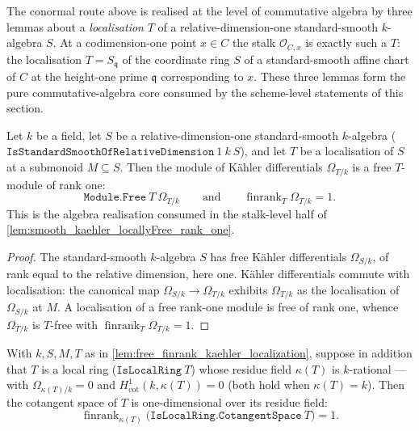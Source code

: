 The conormal route above is realised at the level of commutative algebra by
three lemmas about a \emph{localisation} \(T\) of a relative-dimension-one
standard-smooth \(k\)-algebra \(S\). At a codimension-one point \(x \in C\) the
stalk \(\mathcal O_{C, x}\) is exactly such a \(T\): the localisation
\(T = S_{\mathfrak q}\) of the coordinate ring \(S\) of a standard-smooth affine
chart of \(C\) at the height-one prime \(\mathfrak q\) corresponding to \(x\).
These three lemmas form the pure commutative-algebra core consumed by the
scheme-level statements of this section.

\begin{lemma}
  \label{lem:free_finrank_kaehler_localization}
  Let \(k\) be a field, let \(S\) be a relative-dimension-one standard-smooth
  \(k\)-algebra (\(\texttt{IsStandardSmoothOfRelativeDimension}\ 1\ k\ S\)), and
  let \(T\) be a localisation of \(S\) at a submonoid \(M \subseteq S\). Then the
  module of Kähler differentials \(\Omega_{T/k}\) is a free \(T\)-module of rank
  one:
  \[
    \texttt{Module.Free}\ T\ \Omega_{T/k}
    \qquad\text{and}\qquad
    \operatorname{finrank}_T \Omega_{T/k} = 1.
  \]
  This is the algebra realisation consumed in the stalk-level half of
  \cref{lem:smooth_kaehler_locallyFree_rank_one}.
\end{lemma}

\begin{proof}

\leanok
  The standard-smooth \(k\)-algebra \(S\) has free Kähler differentials
  \(\Omega_{S/k}\), of rank equal to the relative dimension, here one. Kähler
  differentials commute with localisation: the canonical map
  \(\Omega_{S/k} \to \Omega_{T/k}\) exhibits \(\Omega_{T/k}\) as the
  localisation of \(\Omega_{S/k}\) at \(M\).
  A localisation of a
  free rank-one module is free of rank one, whence \(\Omega_{T/k}\) is
  \(T\)-free with \(\operatorname{finrank}_T \Omega_{T/k} = 1\).
\end{proof}

\begin{lemma}

  \label{lem:finrank_cotangent_localization_eq_one}
  With \(k, S, M, T\) as in \cref{lem:free_finrank_kaehler_localization}, suppose
  in addition that \(T\) is a local ring (\(\texttt{IsLocalRing}\ T\)) whose
  residue field \(\kappa(T)\) is \(k\)-rational --- with \(\Omega_{\kappa(T)/k} = 0\)
  and \(H^1_{\mathrm{cot}}(k, \kappa(T)) = 0\) (both hold when
  \(\kappa(T) = k\)). Then the cotangent space of \(T\) is one-dimensional over
  its residue field:
  \[
    \operatorname{finrank}_{\kappa(T)}
      \bigl(\texttt{IsLocalRing.CotangentSpace}\ T\bigr) = 1.
  \]
\end{lemma}

